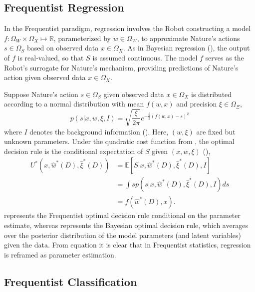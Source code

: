 \subsection{Frequentist Regression}
\label{chp:frequentist_regression}
In the Frequentist paradigm, regression involves the Robot constructing a model $f: \Omega_W \times \Omega_X \mapsto \mathbb{R}$, parameterized by $w \in \Omega_W$, to approximate Nature's actions $s\in \Omega_S$ based on observed data $x\in \Omega_X$. As in Bayesian regression (), the output of $f$ is real-valued, so that $S$ is assumed continuous. The model $f$ serves as the Robot's surrogate for Nature's mechanism, providing predictions of Nature's action given observed data $x \in \Omega_X$. \newline

Suppose Nature's action $s\in\Omega_S$ given observed data $x\in \Omega_X$ is distributed according to a normal distribution with mean $f(w,x)$ and precision $\xi \in \Omega_{\Xi}$,
\begin{equation}
	p(s | x, w, \xi, I) 
	= \sqrt{\frac{\xi}{2\pi}} e^{-\frac{\xi}{2}(f(w,x)-s)^2}
	\label{freq:dist}
\end{equation}
where $I$ denotes the background information (). Here, $(w,\xi)$ are fixed but unknown parameters. Under the quadratic cost function from , the optimal decision rule is the conditional expectation of $S$ given $(x,w,\xi)$ (),
\begin{equation}
	\begin{split}
		U^*(x,\hat{w}^*(D),\hat{\xi}^*(D)) &= \mathbb{E}[S | x, \hat{w}^*(D), \hat{\xi}^*(D), I]\\
		&= \int s p(s | x, \hat{w}^*(D), \hat{\xi}^*(D), I) ds\\
		& = f(\hat{w}^*(D),x).
	\end{split}
	\label{freq:decision}
\end{equation}
 represents the Frequentist optimal decision rule conditional on the parameter estimate, whereas  represents the Bayesian optimal decision rule, which averages over the posterior distribution of the model parameters (and latent variables) given the data. From equation  it is clear that in Frequentist statistics, regression is reframed as parameter estimation.


\subsection{Frequentist Classification}
\label{chp:frequentist_classification}


